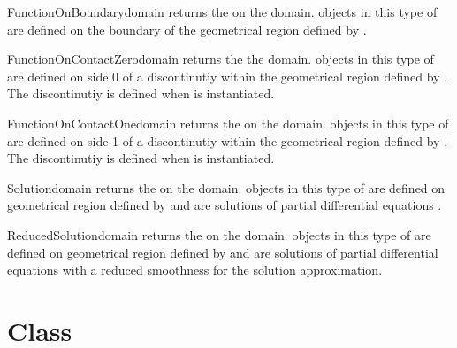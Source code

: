 \begin{funcdesc}{FunctionOnBoundary}{domain}
returns the \ContinuousFunction on the \Domain domain. \Data objects in this type of \Function
are defined on the boundary of the geometrical region defined by . 
\end{funcdesc}

\begin{funcdesc}{FunctionOnContactZero}{domain}
returns the \FunctionOnContactZero the \Domain domain. \Data objects in this type of \Function
are defined on side 0 of a discontinutiy  within the geometrical region defined by .
The discontinutiy is defined when  is instantiated.
\end{funcdesc}

\begin{funcdesc}{FunctionOnContactOne}{domain}
returns the \FunctionOnContactOne on the \Domain domain. 
\Data objects in this type of \Function
are defined on side 1 of a discontinutiy  within the geometrical region defined by .
The discontinutiy is defined when  is instantiated.
\end{funcdesc}

\begin{funcdesc}{Solution}{domain}
returns the \SolutionFS on the \Domain domain. \Data objects in this type of \Function
are defined on geometrical region defined by  and are solutions of
partial differential equations . 
\end{funcdesc}

\begin{funcdesc}{ReducedSolution}{domain}
returns the \ReducedSolutionFS on the \Domain domain. \Data objects in this type of \Function
are defined on geometrical region defined by  and are solutions of
partial differential equations  with a reduced smoothness 
for the solution approximation.
\end{funcdesc}

\section{\Data Class}
\label{SEC ESCRIPT DATA}

